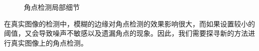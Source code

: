 \documentclass[a4paper,11pt,UTF8]{ctexart}
\begin{document}
\begin{figure}[htbp]
{\begin{minipage}{0.3\textwidth}
    \end{minipage}
    }

    \caption{角点检测局部细节}    %
    \label{su_c}    %
\end{figure}

在真实图像的检测中，模糊的边缘对角点检测的效果影响很大，而如果设置较小的阈值，又会导致噪声不敏感以及遗漏角点的现象。因此，我们需要探寻新的方法进行真实图像上的角点检测。
\end{document}
